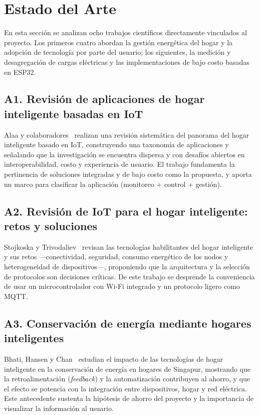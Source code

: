 \documentclass[11pt,a4paper]{article}
\begin{document}
\section{Estado del Arte}
\label{sec:arte}
En esta sección se analizan ocho trabajos científicos directamente vinculados al proyecto. Los primeros cuatro abordan la gestión energética del hogar y la adopción de tecnología por parte del usuario; los siguientes, la medición y desagregación de cargas eléctricas y las implementaciones de bajo costo basadas en ESP32.

\subsection*{A1. Revisión de aplicaciones de hogar inteligente basadas en IoT}
Alaa y colaboradores~\cite{alaa2017} realizan una revisión sistemática del panorama del hogar inteligente basado en IoT, construyendo una taxonomía de aplicaciones y señalando que la investigación se encuentra dispersa y con desafíos abiertos en interoperabilidad, costo y experiencia de usuario. El trabajo fundamenta la pertinencia de soluciones integradas y de bajo costo como la propuesta, y aporta un marco para clasificar la aplicación (monitoreo + control + gestión).

\subsection*{A2. Revisión de IoT para el hogar inteligente: retos y soluciones}
Stojkoska y Trivodaliev~\cite{stojkoska2017} revisan las tecnologías habilitantes del hogar inteligente y sus retos ---conectividad, seguridad, consumo energético de los nodos y heterogeneidad de dispositivos---, proponiendo que la arquitectura y la selección de protocolos son decisiones críticas. De este trabajo se desprende la conveniencia de usar un microcontrolador con Wi-Fi integrado y un protocolo ligero como MQTT.

\subsection*{A3. Conservación de energía mediante hogares inteligentes}
Bhati, Hansen y Chan~\cite{bhati2017} estudian el impacto de las tecnologías de hogar inteligente en la conservación de energía en hogares de Singapur, mostrando que la retroalimentación (\emph{feedback}) y la automatización contribuyen al ahorro, y que el efecto se potencia con la integración entre dispositivos, hogar y red eléctrica. Este antecedente sustenta la hipótesis de ahorro del proyecto y la importancia de visualizar la información al usuario.
\end{document}
